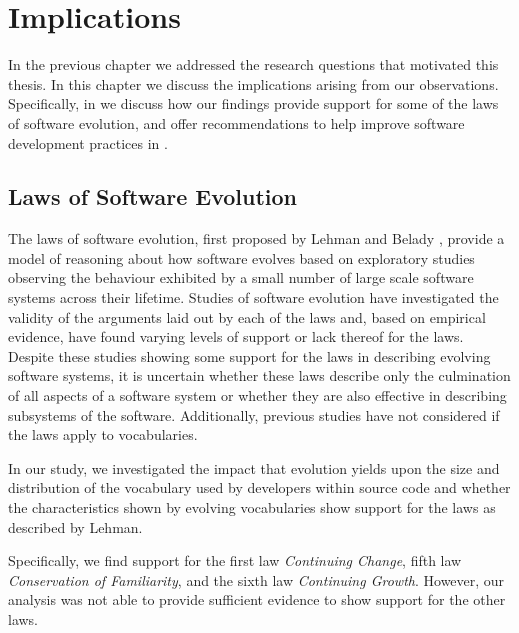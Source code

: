 \chapter{Implications} %
\label{cha:implications}

In the previous chapter we addressed the research questions that motivated this thesis. In this chapter we discuss the implications arising from our observations. Specifically, in  we discuss how our findings provide support for some of the laws of software evolution, and offer recommendations to help improve software development practices in .

\section{Laws of Software Evolution} %
\label{sec:laws_of_software_evolution}

The laws of software evolution, first proposed by Lehman and Belady \cite{Lehman85a}, provide a model of reasoning about how software evolves based on exploratory studies observing the behaviour exhibited by a small number of large scale software systems across their lifetime. Studies of software evolution have investigated the validity of the arguments laid out by each of the laws and, based on empirical evidence, have found varying levels of support \cite{Madhavji06a, Mens08b, DAmbros07a, Vasa10a} or lack thereof \cite{Godfrey00a, WuSpitzer04a, Paulson04a, Capiluppi03a} for the laws. Despite these studies showing some support for the laws in describing evolving software systems, it is uncertain whether these laws describe only the culmination of all aspects of a software system or whether they are also effective in describing subsystems of the software. Additionally, previous studies have not considered if the laws apply to vocabularies.

In our study, we investigated the impact that evolution yields upon the size and distribution of the vocabulary used by developers within source code and whether the characteristics shown by evolving vocabularies show support for the laws as described by Lehman.

Specifically, we find support for the first law \emph{Continuing Change}, fifth law \emph{Conservation of Familiarity}, and the sixth law \emph{Continuing Growth}. However, our analysis was not able to provide sufficient evidence to show support for the other laws.

